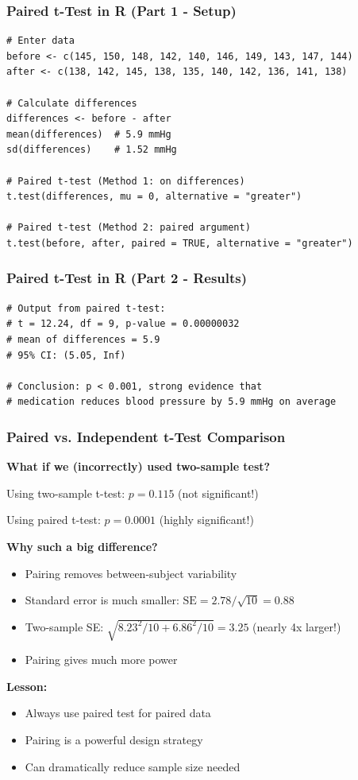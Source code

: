 \documentclass{beamer}
\begin{document}
\begin{frame}[fragile]
\frametitle{Paired t-Test in R (Part 1 - Setup)}
\small
\begin{verbatim}
# Enter data
before <- c(145, 150, 148, 142, 140, 146, 149, 143, 147, 144)
after <- c(138, 142, 145, 138, 135, 140, 142, 136, 141, 138)

# Calculate differences
differences <- before - after
mean(differences)  # 5.9 mmHg
sd(differences)    # 1.52 mmHg

# Paired t-test (Method 1: on differences)
t.test(differences, mu = 0, alternative = "greater")

# Paired t-test (Method 2: paired argument)
t.test(before, after, paired = TRUE, alternative = "greater")
\end{verbatim}
\end{frame}

\begin{frame}[fragile]
\frametitle{Paired t-Test in R (Part 2 - Results)}
\small
\begin{verbatim}
# Output from paired t-test:
# t = 12.24, df = 9, p-value = 0.00000032
# mean of differences = 5.9
# 95% CI: (5.05, Inf)

# Conclusion: p < 0.001, strong evidence that
# medication reduces blood pressure by 5.9 mmHg on average
\end{verbatim}
\end{frame}

\begin{frame}
\frametitle{Paired vs. Independent t-Test Comparison}
\textbf{What if we (incorrectly) used two-sample test?}

\vspace{0.3cm}
Using two-sample t-test: $p = 0.115$ (not significant!)

Using paired t-test: $p = 0.0001$ (highly significant!)

\vspace{0.5cm}
\textbf{Why such a big difference?}
\begin{itemize}
\item Pairing removes between-subject variability
\item Standard error is much smaller: $\text{SE} = 2.78/\sqrt{10} = 0.88$
\item Two-sample SE: $\sqrt{8.23^2/10 + 6.86^2/10} = 3.25$ (nearly 4x larger!)
\item Pairing gives much more power
\end{itemize}

\vspace{0.5cm}
\textbf{Lesson:}
\begin{itemize}
\item Always use paired test for paired data
\item Pairing is a powerful design strategy
\item Can dramatically reduce sample size needed
\end{itemize}
\end{frame}
\end{document}
